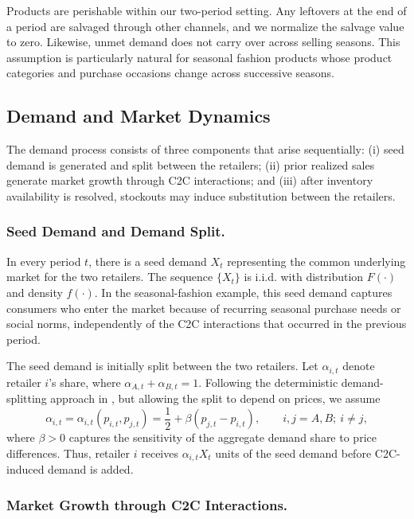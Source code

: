 \documentclass[nonblindrev,copyedit]{informs1}
\begin{document}
Products are perishable within our two-period setting. Any leftovers at the end of a period are salvaged through other channels, and we normalize the salvage value to zero. Likewise, unmet demand does not carry over across selling seasons. This assumption is particularly natural for seasonal fashion products whose product categories and purchase occasions change across successive seasons.

\subsection{Demand and Market Dynamics}

The demand process consists of three components that arise sequentially: (i) seed demand is generated and split between the retailers; (ii) prior realized sales generate market growth through C2C interactions; and (iii) after inventory availability is resolved, stockouts may induce substitution between the retailers.

\subsubsection{Seed Demand and Demand Split.}

In every period $t$, there is a seed demand $X_t$ representing the common underlying market for the two retailers. The sequence $\{X_t\}$ is i.i.d. with distribution $F(\cdot)$ and density $f(\cdot)$. In the seasonal-fashion example, this seed demand captures consumers who enter the market because of recurring seasonal purchase needs or social norms, independently of the C2C interactions that occurred in the previous period.

The seed demand is initially split between the two retailers. Let $\alpha_{i,t}$ denote retailer $i$'s share, where $\alpha_{A,t}+\alpha_{B,t}=1$. Following the deterministic demand-splitting approach in \cite{lm1997}, but allowing the split to depend on prices, we assume
\[
    \alpha_{i,t}
    =\alpha_{i,t}(p_{i,t},p_{j,t})
    =\frac{1}{2}+\beta(p_{j,t}-p_{i,t}),
    \qquad i,j=A,B;\ i\neq j,
\]
where $\beta>0$ captures the sensitivity of the aggregate demand share to price differences. Thus, retailer $i$ receives $\alpha_{i,t}X_t$ units of the seed demand before C2C-induced demand is added.

\subsubsection{Market Growth through C2C Interactions.}
\end{document}
